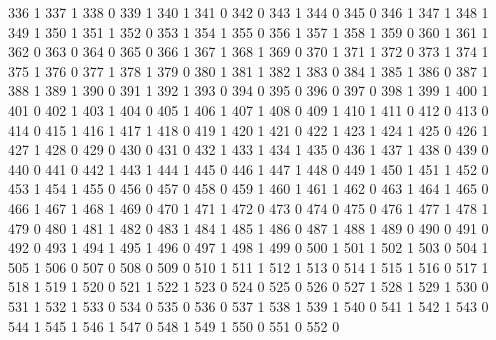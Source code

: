 \documentclass[compress,8pt]{beamer}
\begin{document}
\begin{frame}
\begin{Schunk}
  336     1
  337     1
  338     0
  339     1
  340     1
  341     0
  342     0
  343     1
  344     0
  345     0
  346     1
  347     1
  348     1
  349     1
  350     1
  351     1
  352     0
  353     1
  354     1
  355     0
  356     1
  357     1
  358     1
  359     0
  360     1
  361     1
  362     0
  363     0
  364     0
  365     0
  366     1
  367     1
  368     1
  369     0
  370     1
  371     1
  372     0
  373     1
  374     1
  375     1
  376     0
  377     1
  378     1
  379     0
  380     1
  381     1
  382     1
  383     0
  384     1
  385     1
  386     0
  387     1
  388     1
  389     1
  390     0
  391     1
  392     1
  393     0
  394     0
  395     0
  396     0
  397     0
  398     1
  399     1
  400     1
  401     0
  402     1
  403     1
  404     0
  405     1
  406     1
  407     1
  408     0
  409     1
  410     1
  411     0
  412     0
  413     0
  414     0
  415     1
  416     1
  417     1
  418     0
  419     1
  420     1
  421     0
  422     1
  423     1
  424     1
  425     0
  426     1
  427     1
  428     0
  429     0
  430     0
  431     0
  432     1
  433     1
  434     1
  435     0
  436     1
  437     1
  438     0
  439     0
  440     0
  441     0
  442     1
  443     1
  444     1
  445     0
  446     1
  447     1
  448     0
  449     1
  450     1
  451     1
  452     0
  453     1
  454     1
  455     0
  456     0
  457     0
  458     0
  459     1
  460     1
  461     1
  462     0
  463     1
  464     1
  465     0
  466     1
  467     1
  468     1
  469     0
  470     1
  471     1
  472     0
  473     0
  474     0
  475     0
  476     1
  477     1
  478     1
  479     0
  480     1
  481     1
  482     0
  483     1
  484     1
  485     1
  486     0
  487     1
  488     1
  489     0
  490     0
  491     0
  492     0
  493     1
  494     1
  495     1
  496     0
  497     1
  498     1
  499     0
  500     1
  501     1
  502     1
  503     0
  504     1
  505     1
  506     0
  507     0
  508     0
  509     0
  510     1
  511     1
  512     1
  513     0
  514     1
  515     1
  516     0
  517     1
  518     1
  519     1
  520     0
  521     1
  522     1
  523     0
  524     0
  525     0
  526     0
  527     1
  528     1
  529     1
  530     0
  531     1
  532     1
  533     0
  534     0
  535     0
  536     0
  537     1
  538     1
  539     1
  540     0
  541     1
  542     1
  543     0
  544     1
  545     1
  546     1
  547     0
  548     1
  549     1
  550     0
  551     0
  552     0

\end{Schunk}
\end{frame}
\end{document}
